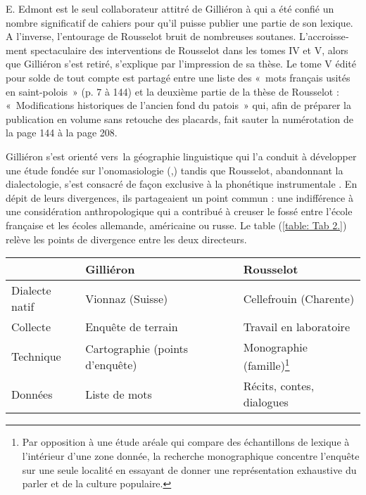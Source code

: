 \documentclass[output=paper]{../langscibook}
\begin{document}
\begin{otherlanguage}{french}
E. Edmont est le seul collaborateur attitré de Gilliéron à qui a été confié un nombre significatif de cahiers pour qu’il puisse publier une partie de son lexique. A l’inverse, l’entourage de Rousselot bruit de nombreuses soutanes. L’accroissement spectaculaire des interventions de Rousselot dans les tomes IV et V, alors que Gilliéron s’est retiré, s’explique par l’impression de sa thèse. Le tome V édité pour solde de tout compte est partagé entre une liste des «~mots français usités en saint-polois~» (p. 7 à 144) et la deuxième partie de la thèse de Rousselot : «~Modifications historiques de l’ancien fond du patois~» qui, afin de préparer la publication en volume sans retouche des placards, fait sauter la numérotation de la page 144 à la page 208.

Gilliéron s’est orienté vers~la géographie linguistique qui l’a conduit à développer une étude fondée sur l’onomasiologie (\citeyear{gillieron_scier_1905},\citeyear{gillieron_genealogie_1918}) tandis que Rousselot, abandonnant la dialectologie, s’est consacré de façon exclusive à la phonétique instrumentale \citeyear{rousselot_principes_1897}. En dépit de leurs divergences, ils partageaient un point commun : une indifférence à une considération anthropologique qui a contribué à creuser le fossé entre l’école française et les écoles allemande, américaine ou russe. Le table (\ref{table: Tab 2.}) relève les points de divergence entre les deux directeurs.

\begin{table}    
\begin{tabularx}{\textwidth}{lQQ}
\lsptoprule
& Gilliéron        &       Rousselot \\\midrule

Dialecte natif  & Vionnaz (Suisse)    &   Cellefrouin (Charente) \\

Collecte & Enquête de terrain   &   Travail en laboratoire \\

Technique & Cartographie (points d’enquête)  &  Monographie (famille)\footnote{Par opposition à une étude aréale qui compare des échantillons de lexique à l’intérieur d’une zone donnée, la recherche monographique concentre l’enquête sur une seule localité en essayant de donner une représentation exhaustive du parler et de la culture populaire.}\\

Données &  Liste de mots   &     Récits, contes, dialogues\\


\end{tabularx}
\end{table}
\end{otherlanguage}
\end{document}

